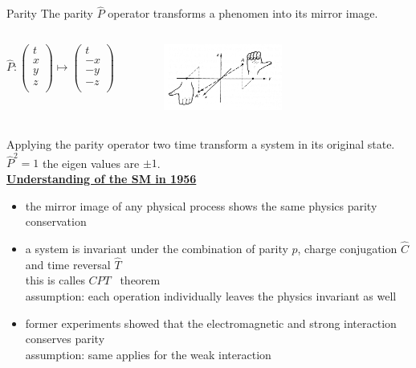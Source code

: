 \documentclass[aspectratio=1610, 10pt]{beamer}
\begin{document}
\begin{frame}{Parity}
	The parity $\hat{P}$ operator transforms a phenomen into its mirror image.\\
	\begin{columns}
		$\hat{P} : \begin{pmatrix}
		t\\
		x\\
		y\\
		z\\
		\end{pmatrix} \mapsto \begin{pmatrix}
		t\\
		-x\\
		-y\\
		-z\\
		\end{pmatrix}$
		\begin{figure}
			\includegraphics[width=0.55\textwidth]{images/parity_hand.pdf}
		\end{figure}
		\nocite{griffiths}
	\end{columns}
	Applying the parity operator two time transform a system in its original state.\\
	$\hat{P}^2=1$ \textrightarrow the eigen values are $\pm 1$.\\
	\underline{\textbf{Understanding of the SM in 1956}}
	\begin{itemize}
		\item the mirror image of any physical process shows the same physics \textrightarrow parity conservation \cite{feynman}
		\item a system is invariant under the combination of parity $\hat{p}$, charge conjugation $\hat{C}$ and time reversal $\hat{T}$\\
		\textrightarrow this is calles $CPT$~ theorem\\
		\textrightarrow assumption: each operation individually leaves the physics invariant as well\\
		\item former experiments showed that the electromagnetic and strong interaction conserves parity\\
		\textrightarrow assumption: same applies for the weak interaction
	\end{itemize}
\end{frame}
\end{document}
